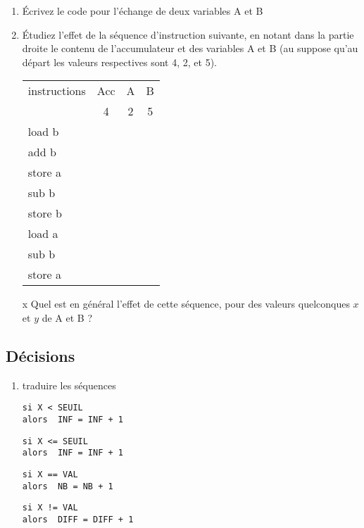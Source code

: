 \documentclass[10pt]{article}
\begin{document}
\begin{multicols*}{2}
\begin{enumerate}
   
\item Écrivez le code pour l'échange de deux variables A et B

\item Étudiez l'effet de la séquence d'instruction suivante, en notant
dans la partie droite le contenu de l'accumulateur et des variables A et B
(au suppose qu'au départ les valeurs respectives sont 4, 2, et 5).

\begin{center}
\begin{tabular}{|l||ccc|}
\hline
  instructions  &   Acc & A & B \\ 
                &    4  & 2 & 5 \\
\hline
   load b       &       &   &   \\
   add b  &&& \\
 store a &&& \\
 sub b &&& \\
 store b &&& \\
 load a &&& \\
 sub b &&& \\
 store a &&& \\
\hline
\end{tabular}
\end{center}x
Quel est en général l'effet de cette séquence, pour des valeurs 
quelconques $x$ et $y$  de A et B ?
\end{enumerate}

\subsection{Décisions}

\begin{enumerate}
\item traduire les séquences
\begin{lstlisting}[frame=single]
si X < SEUIL 
alors  INF = INF + 1
\end{lstlisting}
\begin{lstlisting}[frame=single]
si X <= SEUIL 
alors  INF = INF + 1
\end{lstlisting}
\begin{lstlisting}[frame=single]
si X == VAL 
alors  NB = NB + 1
\end{lstlisting}
\begin{lstlisting}[frame=single]
si X != VAL 
alors  DIFF = DIFF + 1
\end{lstlisting}
\end{enumerate}


\end{multicols*}
\end{document}
